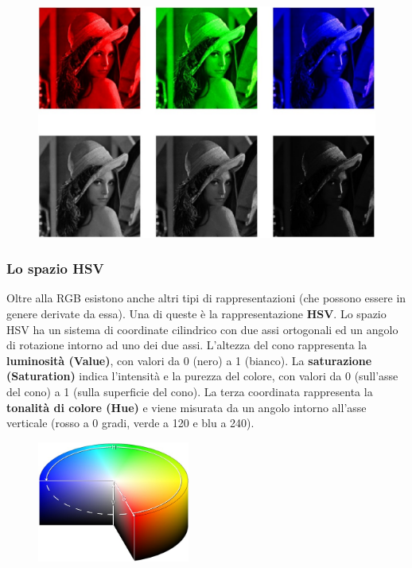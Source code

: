\begin{figure}[H]
    \centering
    \includegraphics[width=12cm, keepaspectratio]{capitoli/immagini/imgs/canali_RGB_e_grigio.jpg}
\end{figure}

\subsubsection{Lo spazio HSV}

Oltre alla RGB esistono anche altri tipi di rappresentazioni (che
possono essere in genere derivate da essa).
Una di queste è la rappresentazione \textbf{HSV}. Lo spazio HSV ha un
sistema di coordinate cilindrico con due assi ortogonali ed un
angolo di rotazione intorno ad uno dei due assi.
L'altezza del cono rappresenta la \textbf{luminosità (Value)}, con valori da
0 (nero) a 1 (bianco). La \textbf{saturazione (Saturation)} indica l'intensità
e la purezza del colore, con valori da 0 (sull'asse del cono) a 1
(sulla superficie del cono). La terza coordinata rappresenta la
\textbf{tonalità di colore (Hue)} e viene misurata da un angolo intorno
all'asse verticale (rosso a 0 gradi, verde a 120 e blu a 240).

\begin{figure}[H]
    \centering
    \includegraphics[width=5cm, keepaspectratio]{capitoli/immagini/imgs/cilindro_hsv.jpg}
\end{figure}



